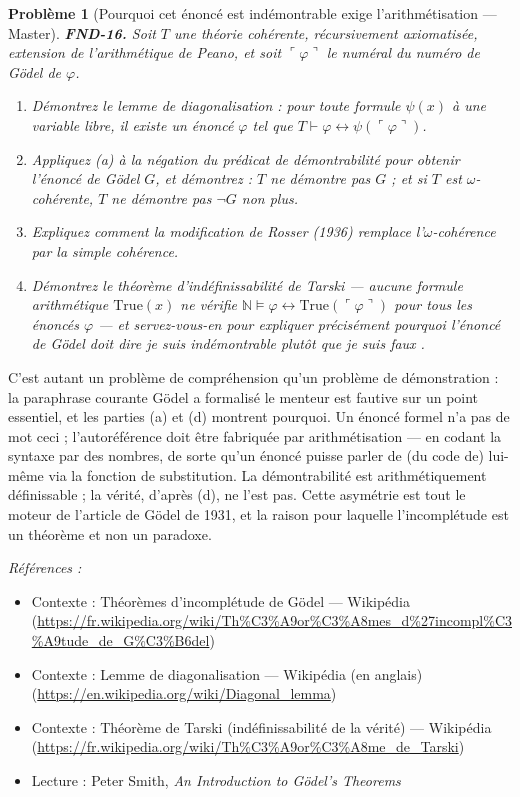 \documentclass[11pt]{article}
\newtheorem{problem}{Problème}
\newenvironment{refs}{\par\small\noindent\emph{Références :}\begin{itemize}\setlength\itemsep{0pt}}{\end{itemize}\normalsize}
\begin{document}
\begin{problem}[{Pourquoi \og{} cet énoncé est indémontrable \fg{} exige l'arithmétisation --- Master}]
\textbf{FND-16.} Soit $ T $ une théorie cohérente, récursivement axiomatisée,
extension de l'arithmétique de Peano, et soit $ \ulcorner \varphi \urcorner $ le
numéral du numéro de Gödel de $ \varphi $.
\begin{enumerate}
\item[(a)] Démontrez le lemme de diagonalisation : pour toute formule
$ \psi(x) $ à une variable libre, il existe un énoncé $ \varphi $ tel que
$ T \vdash \varphi \leftrightarrow \psi(\ulcorner \varphi \urcorner) $.
\item[(b)] Appliquez (a) à
la négation du prédicat de démontrabilité pour obtenir l'énoncé de Gödel $ G $, et démontrez :
$ T $ ne démontre pas $ G $ ; et si $ T $ est $ \omega $-cohérente, $ T $ ne démontre
pas $ \neg G $ non plus.
\item[(c)] Expliquez comment la modification de Rosser (1936) remplace
l'$ \omega $-cohérence par la simple cohérence.
\item[(d)] Démontrez le théorème d'indéfinissabilité de Tarski --- aucune
formule arithmétique $ \mathrm{True}(x) $ ne vérifie $ \mathbb{N} \models \varphi
\leftrightarrow \mathrm{True}(\ulcorner \varphi \urcorner) $ pour tous les énoncés $ \varphi $
--- et servez-vous-en pour expliquer précisément pourquoi l'énoncé de Gödel doit dire \og{} je suis
indémontrable \fg{} plutôt que \og{} je suis faux \fg{}.
\end{enumerate}

\end{problem}

\noindent C'est autant un problème de compréhension qu'un problème de démonstration : la
paraphrase courante \og{} Gödel a formalisé le menteur \fg{} est fautive sur un point essentiel, et les
parties (a) et (d) montrent pourquoi. Un énoncé formel n'a pas de mot \og{} ceci \fg{} ; l'autoréférence
doit être fabriquée par arithmétisation --- en codant la syntaxe par des nombres, de sorte qu'un
énoncé puisse parler de (du code de) lui-même via la fonction de substitution. La démontrabilité
est arithmétiquement définissable ; la vérité, d'après (d), ne l'est pas. Cette asymétrie est tout
le moteur de l'article de Gödel de 1931, et la raison pour laquelle l'incomplétude est un théorème
et non un paradoxe.

\begin{refs}
\item Contexte : Théorèmes d'incomplétude de Gödel --- Wikipédia (\url{https://fr.wikipedia.org/wiki/Th%C3%A9or%C3%A8mes_d%27incompl%C3%A9tude_de_G%C3%B6del})
\item Contexte : Lemme de diagonalisation --- Wikipédia (en anglais) (\url{https://en.wikipedia.org/wiki/Diagonal_lemma})
\item Contexte : Théorème de Tarski (indéfinissabilité de la vérité) --- Wikipédia (\url{https://fr.wikipedia.org/wiki/Th%C3%A9or%C3%A8me_de_Tarski})
\item Lecture : Peter Smith, \textit{An Introduction to Gödel's Theorems}
\end{refs}
\end{document}
